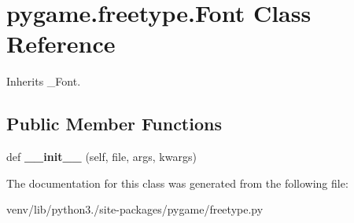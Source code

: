 \hypertarget{classpygame_1_1freetype_1_1_font}{}\section{pygame.\+freetype.\+Font Class Reference}
\label{classpygame_1_1freetype_1_1_font}


Inherits \+\_\+\+Font.

\subsection*{Public Member Functions}
\begin{DoxyCompactItemize}
\item 
\mbox{\label{classpygame_1_1freetype_1_1_font_ab3bbcc0cf5e0c87c6149960caa340412}} 
def {\bfseries \+\_\+\+\_\+init\+\_\+\+\_\+} (self, file, args, kwargs)
\end{DoxyCompactItemize}


The documentation for this class was generated from the following file\+:\begin{DoxyCompactItemize}
\item 
venv/lib/python3./site-\/packages/pygame/freetype.\+py\end{DoxyCompactItemize}
